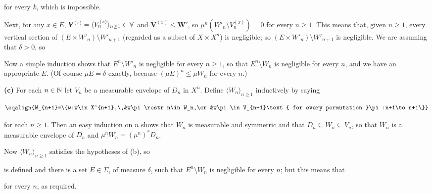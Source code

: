 {

\noindent for every $k$, which is impossible.\ \Bang\Qed

\medskip

 Next, for any $x\in E$,
$\pmb{V}^{(x)}=\langle V^{(x)}_n\rangle_{n\ge 1}\in\Bbb V$ and
$\pmb{V}^{(x)}\le\pmb{W}'$, so
$\mu^n(W'_n\setminus V^{(x)}_n)=0$ for every $n\ge 1$.   This means
that, given $n\ge 1$, every vertical section of
$(E\times W'_n)\setminus W'_{n+1}$ (regarded as a subset of
$X\times X^n$) is negligible;  so $(E\times W'_n)\setminus W'_{n+1}$ is
negligible.   We are assuming that $\delta>0$, so


\noindent Now a simple induction shows that $E^n\setminus W'_n$ is
negligible for every $n\ge 1$, so that $E^n\setminus W_n$ is negligible
for every $n$, and we have an appropriate $E$.   (Of
course $\mu E=\delta$ exactly, because $(\mu E)^n\le\mu W_n$ for every
$n$.)

\medskip

{\bf (c)} For each $n\in\Bbb N$ let $V_n$ be a measurable envelope of
$D_n$ in $X^n$.   Define $\langle W_n\rangle_{n\ge 1}$ inductively by
saying


$$\eqalign{W_{n+1}=\{w:w\in X^{n+1},\,&w\pi\restr n\in W_n,\cr
&w\pi\in V_{n+1}\text{ for every permutation }\pi:n+1\to n+1\}}$$

\noindent for each $n\ge 1$.   Then an easy induction on $n$ shows
that $W_n$ is measurable and symmetric and that $D_n\subseteq
W_n\subseteq V_n$, so that $W_n$ is a measurable envelope of $D_n$ and
$\mu^nW_n=(\mu^n)^*D_n$.

Now $\langle W_n\rangle_{n\ge 1}$ satisfies the hypotheses of (b), so


\noindent is defined and there is a set
$E\in\Sigma$, of measure $\delta$, such that $E^n\setminus W_n$ is
negligible for every $n$;  but this means that


\noindent for every $n$, as required.
}%

